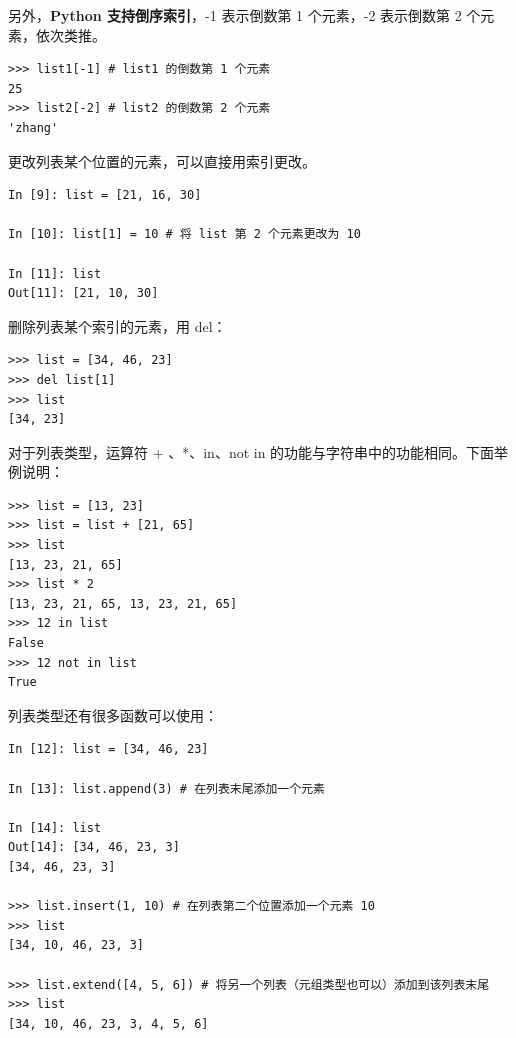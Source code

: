另外，\textbf{Python 支持倒序索引}，-1 表示倒数第 1 个元素，-2 表示倒数第 2 个元素，依次类推。

\begin{lstlisting}[Language=Python]
>>> list1[-1] # list1 的倒数第 1 个元素
25
>>> list2[-2] # list2 的倒数第 2 个元素
'zhang'
\end{lstlisting}

更改列表某个位置的元素，可以直接用索引更改。

\begin{lstlisting}[Language=Python]
In [9]: list = [21, 16, 30]

In [10]: list[1] = 10 # 将 list 第 2 个元素更改为 10

In [11]: list
Out[11]: [21, 10, 30]
\end{lstlisting}

删除列表某个索引的元素，用 del：

\begin{lstlisting}[Language=Python]
>>> list = [34, 46, 23]
>>> del list[1]
>>> list
[34, 23]
\end{lstlisting}

对于列表类型，运算符 + 、*、in、not in 的功能与字符串中的功能相同。下面举例说明：

\begin{lstlisting}[Language=Python]
>>> list = [13, 23]
>>> list = list + [21, 65]
>>> list
[13, 23, 21, 65]
>>> list * 2
[13, 23, 21, 65, 13, 23, 21, 65]
>>> 12 in list
False
>>> 12 not in list
True
\end{lstlisting}

列表类型还有很多函数可以使用：

\begin{lstlisting}[Language=Python]
In [12]: list = [34, 46, 23]

In [13]: list.append(3) # 在列表末尾添加一个元素

In [14]: list
Out[14]: [34, 46, 23, 3]
[34, 46, 23, 3]

>>> list.insert(1, 10) # 在列表第二个位置添加一个元素 10
>>> list
[34, 10, 46, 23, 3]

>>> list.extend([4, 5, 6]) # 将另一个列表（元组类型也可以）添加到该列表末尾
>>> list
[34, 10, 46, 23, 3, 4, 5, 6]
\end{lstlisting}

